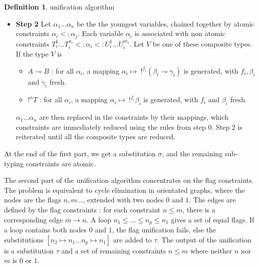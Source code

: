 \documentclass[9pt]{article}
\theoremstyle{plain}
\theoremstyle{definition}
\newtheorem{defn}{Definition}[subsection] %
\begin{document}
\begin{defn}{unification algorithm}
\begin{itemize}
  	\item{\bf Step 2} Let $\alpha_1 \dots \alpha_n$ be the the youngest variables, chained together by atomic constraints
  		$\alpha_i <: \alpha_j$. Each variable $\alpha_i$ is associated with non atomic constraints $T_i^1 \dots T_i^{n_i} <: \alpha_i
  		<: U_i^1 \dots U_i^{m_i}$. Let $V$ be one of these composite types.
  		If the type $V$ is
  		\begin{itemize}
  			\item $A \multimap B$ : for all $\alpha_i$, a mapping $\alpha_i \mapsto ~ !^{f_i} (\beta_i \multimap \gamma_i)$ is generated,
  				with $f_i, \beta_i$ and $\gamma_i$ fresh.
  			\item $!^n T$ : for all $\alpha_i$, a mapping $\alpha_i \mapsto ~ !^{f_i} \beta_i$ is generated,
  				with $f_i$ and $\beta_i$ fresh.
  		\end{itemize}
		  $\alpha_1 \dots \alpha_n$ are then replaced in the constraints by their mappings, which constraints are immediately reduced
		  using the rules from step 0. Step 2 is reiterated until all the composite types are reduced.  	
  \end{itemize}

	At the end of the first part, we get a substitution $\sigma$, and the remaining sub-typing constraints are atomic.
	
	The second part of the unification algorithm concentrates on the flag constraints.
	The problem is equivalent to cycle elimination in orientated graphs, where the nodes are the flags
	$n, m \dots$, extended with two nodes $0$ and $1$. The edges are defined by the flag constraints :
	for each constraint $n \le m$, there is a corresponding edge $m \rightarrow n$.
	A loop $n_1 \le \dots \le n_p \le n_1$ gives a set of equal flags. If a loop contains both nodes $0$ and $1$, the
	flag unification fails, else the substitutions $[n_2 \mapsto n_1 \dots n_p \mapsto n_1]$ are added to $\tau$.
	The output of the unification is a substitution $\tau$ and a set of remaining constraints $n \le m$ where neither
	$n$ nor $m$ is $0$ or $1$.

\end{defn}
\end{document}
